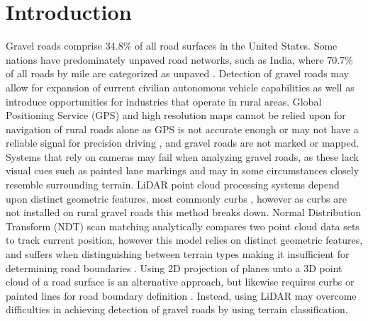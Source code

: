 \documentclass[balance,upint,subscriptcorrection,varvw,mathalfa=cal=boondoxo,colorlinks]{asmeconf}
\begin{document}
	
	
\section{Introduction}

	
	
	{Gravel roads comprise 34.8\% \cite{road_stats_2} of all road surfaces in the United States. Some nations have predominately unpaved road networks, such as India, where 70.7\% of all roads by mile are categorized as unpaved \cite{malik_lal_2019}. Detection of gravel roads may allow for expansion of current civilian autonomous vehicle capabilities as well as introduce opportunities for industries that operate in rural areas. Global Positioning Service (GPS) and high resolution maps cannot be relied upon for navigation of rural roads alone as GPS is not accurate enough or may not have a reliable signal for precision driving \cite{noauthor_gpsgov_nodate}, and gravel roads are not marked or mapped. Systems that rely on cameras may fail when analyzing gravel roads, as these lack visual cues such as painted lane markings \cite{crisman_scarf_1993} and may in some circumstances closely resemble surrounding terrain. LiDAR point cloud processing systems depend upon distinct geometric features, most commonly curbs \cite{yadav_extraction_2017,liu_new_2013,qiu_fast_2016,fernandes_road_2014,seker_experiments_nodate,yang_semi-automated_2013,miyazaki_line-based_2014,hervieu_road_2013,smadja_road_nodate}, however as curbs are not installed on rural gravel roads \cite{skorseth_gravel_nodate} this method breaks down. Normal Distribution Transform (NDT) scan matching analytically compares two point cloud data sets to track current position, however this model relies on distinct geometric features, and suffers when distinguishing between terrain types making it insufficient for determining road boundaries \cite{biber_normal_2003}. Using 2D projection of planes unto a 3D point cloud of a road surface is an alternative approach, but likewise requires curbs or painted lines for road boundary definition \cite{fernandes_road_2014, borkar_robust_2009-1, guo_lane_2015}. Instead, using LiDAR may overcome difficulties in achieving detection of gravel roads by using terrain classification.} 
	
\end{document}
